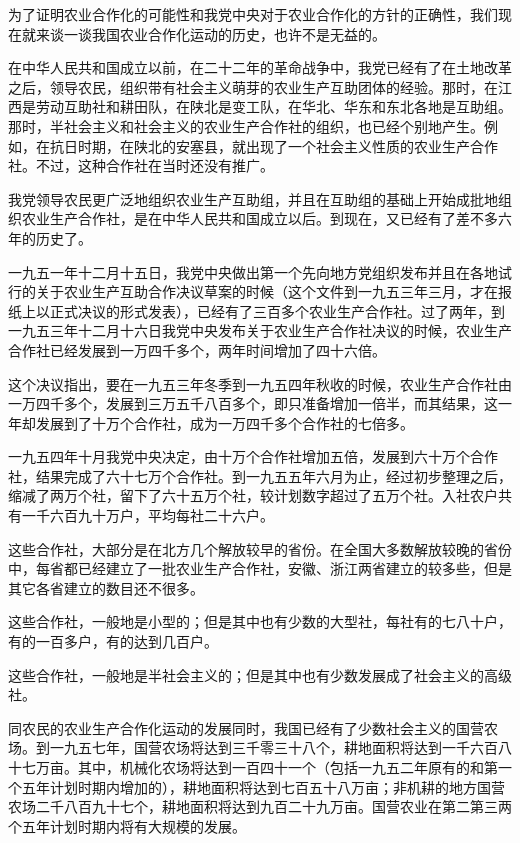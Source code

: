 为了证明农业合作化的可能性和我党中央对于农业合作化的方针的正确性，我们现在就来谈一谈我国农业合作化运动的历史，也许不是无益的。

在中华人民共和国成立以前，在二十二年的革命战争中，我党已经有了在土地改革之后，领导农民，组织带有社会主义萌芽的农业生产互助团体的经验。那时，在江西是劳动互助社和耕田队，在陕北是变工队，在华北、华东和东北各地是互助组。那时，半社会主义和社会主义的农业生产合作社的组织，也已经个别地产生。例如，在抗日时期，在陕北的安塞县，就出现了一个社会主义性质的农业生产合作社。不过，这种合作社在当时还没有推广。

我党领导农民更广泛地组织农业生产互助组，并且在互助组的基础上开始成批地组织农业生产合作社，是在中华人民共和国成立以后。到现在，又已经有了差不多六年的历史了。

一九五一年十二月十五日，我党中央做出第一个先向地方党组织发布并且在各地试行的关于农业生产互助合作决议草案的时候（这个文件到一九五三年三月，才在报纸上以正式决议的形式发表），已经有了三百多个农业生产合作社。过了两年，到一九五三年十二月十六日我党中央发布关于农业生产合作社决议的时候，农业生产合作社已经发展到一万四千多个，两年时间增加了四十六倍。

这个决议指出，要在一九五三年冬季到一九五四年秋收的时候，农业生产合作社由一万四千多个，发展到三万五千八百多个，即只准备增加一倍半，而其结果，这一年却发展到了十万个合作社，成为一万四千多个合作社的七倍多。

一九五四年十月我党中央决定，由十万个合作社增加五倍，发展到六十万个合作社，结果完成了六十七万个合作社。到一九五五年六月为止，经过初步整理之后，缩减了两万个社，留下了六十五万个社，较计划数字超过了五万个社。入社农户共有一千六百九十万户，平均每社二十六户。

这些合作社，大部分是在北方几个解放较早的省份。在全国大多数解放较晚的省份中，每省都已经建立了一批农业生产合作社，安徽、浙江两省建立的较多些，但是其它各省建立的数目还不很多。

这些合作社，一般地是小型的；但是其中也有少数的大型社，每社有的七八十户，有的一百多户，有的达到几百户。

这些合作社，一般地是半社会主义的；但是其中也有少数发展成了社会主义的高级社。

同农民的农业生产合作化运动的发展同时，我国已经有了少数社会主义的国营农场。到一九五七年，国营农场将达到三千零三十八个，耕地面积将达到一千六百八十七万亩。其中，机械化农场将达到一百四十一个（包括一九五二年原有的和第一个五年计划时期内增加的），耕地面积将达到七百五十八万亩；非机耕的地方国营农场二千八百九十七个，耕地面积将达到九百二十九万亩。国营农业在第二第三两个五年计划时期内将有大规模的发展。

